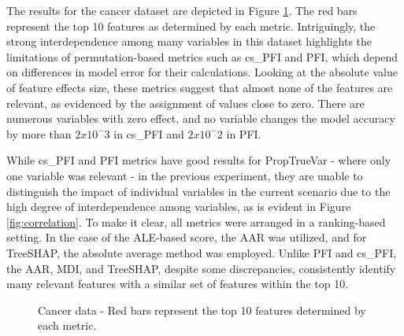 The results for the cancer dataset are depicted in Figure \ref{fig:cancer}. The red bars represent the top 10 features as determined by each metric. Intriguingly, the strong interdependence among many variables in this dataset highlights the limitations of permutation-based metrics such as cs\_PFI and PFI, which depend on differences in model error for their calculations. Looking at the absolute value of feature effects size, these metrics suggest that almost none of the features are relevant, as evidenced by the assignment of values close to zero. There are numerous variables with zero effect, and no variable changes the model accuracy by more than \(2 x 10^-3\) in cs\_PFI and \(2 x 10^-2\) in PFI. 

While cs\_PFI and PFI metrics have good results for PropTrueVar - where only one variable was relevant -  in the previous experiment, they are unable to distinguish the impact of individual variables in the current scenario due to the high degree of interdependence among variables, as is evident in Figure \ref{fig:correlation}. To make it clear, all metrics were arranged in a ranking-based setting. In the case of the ALE-based score, the AAR was utilized, and for TreeSHAP, the absolute average method was employed. Unlike PFI and cs\_PFI, the AAR, MDI, and TreeSHAP, despite some discrepancies, consistently identify many relevant features with a similar set of features within the top 10.

\begin{figure}[ht!]
\centering
  \caption{Cancer data - Red bars represent the top 10 features determined by each metric.}
    \label{fig:cancer}
\end{figure}

